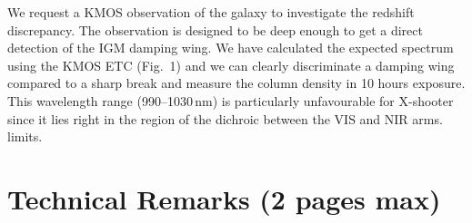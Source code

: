 \documentclass[letter,12pt]{article}
\begin{document}
\hspace*{1cm} We request a KMOS observation of the galaxy to investigate the
redshift discrepancy.  The observation is designed to be deep enough to get
a direct detection of the IGM damping wing.  We have calculated the expected
spectrum using the KMOS ETC (Fig.~1) and we can clearly discriminate a
damping wing compared to a sharp break and measure the column density in 10
hours exposure.  This wavelength range (990--1030\,nm) is particularly
unfavourable for X-shooter since it lies right in the region of the dichroic
between the VIS and NIR arms. 
limits.


\section{Technical Remarks (2 pages max)}
\end{document}
